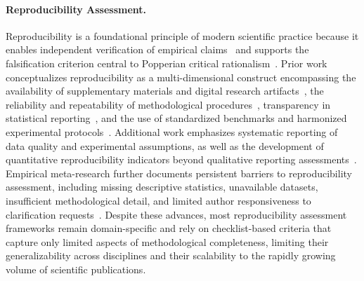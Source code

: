 \documentclass{article}
\begin{document}
\paragraph{Reproducibility Assessment.}
Reproducibility is a foundational principle of modern scientific practice because it enables independent verification of empirical claims~\citep{riehl2025revisiting} and supports the falsification criterion central to Popperian critical rationalism~\citep{popperDE,popperEN}. 
Prior work conceptualizes reproducibility as a multi-dimensional construct encompassing the availability of supplementary materials and digital research artifacts~\citep{riehl2025revisiting,stagge2019assessing}, the reliability and repeatability of methodological procedures~\citep{downing2004reliability,bazzocchi2011accuracy,crowley2016critical,bunting2019practical}, transparency in statistical reporting~\citep{hung2020statistical,held2024assessment}, and the use of standardized benchmarks and harmonized experimental protocols~\citep{crowley2016critical,arroyo2022systematic}. 
Additional work emphasizes systematic reporting of data quality and experimental assumptions, as well as the development of quantitative reproducibility indicators beyond qualitative reporting assessments~\citep{crowley2016critical}. 
Empirical meta-research further documents persistent barriers to reproducibility assessment, including missing descriptive statistics, unavailable datasets, insufficient methodological detail, and limited author responsiveness to clarification requests~\cite{errington2014open}. 
Despite these advances, most reproducibility assessment frameworks remain domain-specific and rely on checklist-based criteria that capture only limited aspects of methodological completeness, limiting their generalizability across disciplines and their scalability to the rapidly growing volume of scientific publications.
\end{document}
